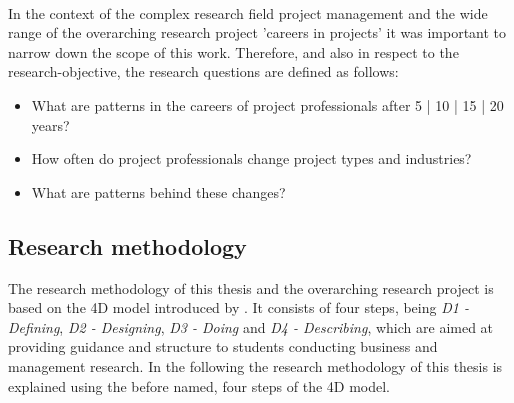 \\ [.1cm]
In the context of the complex research field project management and the wide range of the overarching research project 'careers in projects' it was important to narrow down the scope of this work. Therefore, and also in respect to the research-objective, the research questions are defined as follows: 
\begin{itemize}[itemsep=0.05cm]
    \item What are patterns in the careers of project professionals after 5 | 10 | 15 | 20 years?
    \item How often do project professionals change project types and industries?
    \item What are patterns behind these changes?
\end{itemize}
\clearpage

\subsection{Research methodology}
The research methodology of this thesis and the overarching research project is based on the 4D model introduced by .
It consists of four steps, being \textit{D1 - Defining}, \textit{D2 - Designing}, \textit{D3 - Doing} and \textit{D4 - Describing}, which are aimed at providing guidance and structure to students conducting business and management research. In the following the research methodology of this thesis is explained using the before named, four steps of the 4D model. \\

